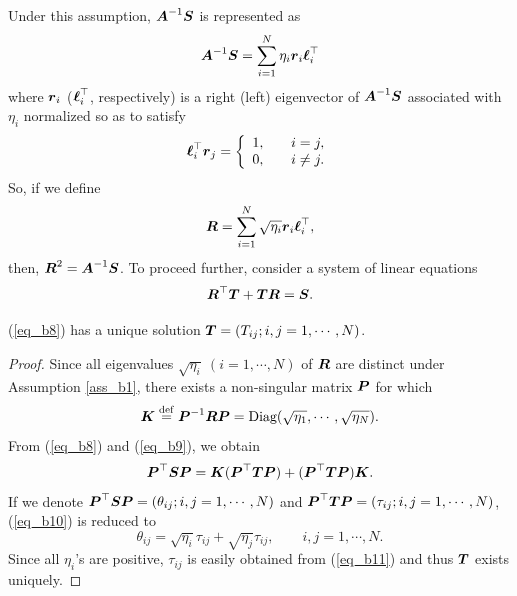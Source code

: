  Under this assumption, $\keymtx$ is represented as
\[ %
  \keymtx = \sum_{i=1}^N \eta_i \r_i \l_i^\top
\] %
where $\r_i$ ($\l_i^\top$, respectively) is a right (left) eigenvector of $\keymtx$ associated with
$\eta_i$ normalized so as to satisfy
\[ %
  \l_i^\top \r_j = \left\{
  \begin{array}{ll}
   1, & \quad i=j, \\
   0, & \quad i \neq j.
  \end{array}
  \right.
\] %
 So, if we define
\begin{equation}\label{eq_b7}
  \R = \sum_{i=1}^N \sqrt{\eta_i} \r_i \l_i^\top,
\end{equation}
then, $\R^2 = \keymtx$.
 To proceed further, consider a system of linear equations
\begin{equation}\label{eq_b8}
  \R^\top \T + \T \R = \S.
\end{equation}
\begin{lemma}\label{lem_b4}
 \quad (\ref{eq_b8}) has a unique solution $\T = ( T_{ij}; i,j=1,\cdots,N)$.
\end{lemma}
\begin{proof}
 Since all eigenvalues $\sqrt{\eta_i}\ (i=1,\cdots,N)$ of $\R$ are distinct under Assumption \ref{ass_b1}, there exists a non-singular matrix $\P$ for which
\begin{equation}\label{eq_b9}
  \K \define \P^{-1}\R\P = \mbox{Diag}(\sqrt{\eta_1}, \cdots, \sqrt{\eta_N}).
\end{equation}
 From (\ref{eq_b8}) and (\ref{eq_b9}), we obtain
\begin{equation}\label{eq_b10}
  \P^\top\S\P = \K (\P^\top\T\P) + (\P^\top\T\P) \K.
\end{equation}
 If we denote $\P^\top\S\P = ( \theta_{ij}; i,j=1,\cdots,N)$ and $\P^\top\T\P = ( \tau_{ij}; i,j=1,\cdots,N )$, (\ref{eq_b10}) is reduced to
\begin{equation}\label{eq_b11}
 \theta_{ij} = \sqrt{\eta_i} \tau_{ij} + \sqrt{\eta_j} \tau_{ij}, \qquad i,j=1,\cdots,N.
\end{equation}
 Since all $\eta_i$'s are positive, $\tau_{ij}$ is easily obtained from (\ref{eq_b11}) and thus $\T$ exists uniquely.
\end{proof}

